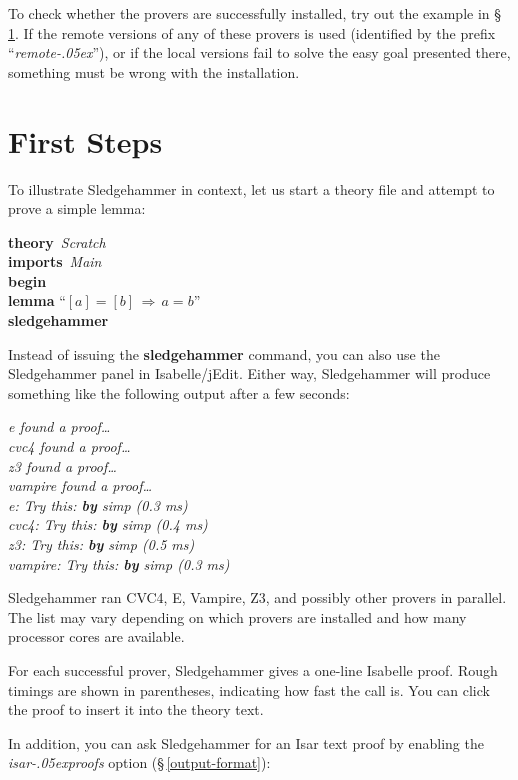 \documentclass[a4paper,12pt]{article}
\let\oldS=\S
\def\S{\oldS\,}
\renewcommand\_{\hbox{\textunderscore\kern-.05ex}}
\begin{document}
To check whether the provers are successfully installed, try out the example
in \S\ref{first-steps}. If the remote versions of any of these provers is used
(identified by the prefix ``\textit{remote\_\/}''), or if the local versions
fail to solve the easy goal presented there, something must be wrong with the
installation.


\section{First Steps}
\label{first-steps}

To illustrate Sledgehammer in context, let us start a theory file and
attempt to prove a simple lemma:

\prew
\textbf{theory}~\textit{Scratch} \\
\noindent\hbox{}\quad \textbf{imports}~\textit{Main} \\
\textbf{begin} \\[2\smallskipamount]
%
\textbf{lemma} ``$[a] = [b] \,\Longrightarrow\, a = b$'' \\
\textbf{sledgehammer}
\postw

Instead of issuing the \textbf{sledgehammer} command, you can also use the
Sledgehammer panel in Isabelle/jEdit. Either way, Sledgehammer will produce
something like the following output after a few seconds:

\prew
\slshape
e found a proof\ldots \\
cvc4 found a proof\ldots \\
z3 found a proof\ldots \\
vampire found a proof\ldots \\
e: Try this: \textbf{by} \textit{simp} (0.3 ms) \\
cvc4: Try this: \textbf{by} \textit{simp} (0.4 ms) \\
z3: Try this: \textbf{by} \textit{simp} (0.5 ms) \\
vampire: Try this: \textbf{by} \textit{simp} (0.3 ms)
\postw

Sledgehammer ran CVC4, E, Vampire, Z3, and possibly other provers in parallel.
The list may vary depending on which provers are installed and how many
processor cores are available.

For each successful prover, Sledgehammer gives a one-line Isabelle proof. Rough
timings are shown in parentheses, indicating how fast the call is. You can
click the proof to insert it into the theory text.

In addition, you can ask Sledgehammer for an Isar text proof by enabling the
\textit{isar\_proofs} option (\S\ref{output-format}):
\end{document}
